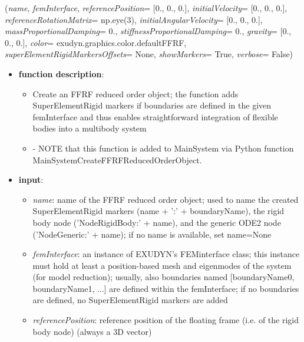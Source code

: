 %
\begin{flushleft}
\label{sec:mainsystemextensions:CreateFFRFReducedOrderObject}
({\it name}, {\it femInterface}, {\it referencePosition}= [0., 0., 0.], {\it initialVelocity}= [0., 0., 0.], {\it referenceRotationMatrix}= np.eye(3), {\it initialAngularVelocity}= [0., 0., 0.], {\it massProportionalDamping}= 0., {\it stiffnessProportionalDamping}= 0., {\it gravity}= [0., 0., 0.], {\it color}= exudyn.graphics.color.defaultFFRF, {\it superElementRigidMarkersOffsets}= None, {\it showMarkers}= True, {\it verbose}= False)
\end{flushleft}
\setlength{\itemindent}{0.7cm}
\begin{itemize}[leftmargin=0.7cm]
\item[--]
{\bf function description}: \vspace{-6pt}
\begin{itemize}[leftmargin=1.2cm]
\setlength{\itemindent}{-0.7cm}
\item[]Create an FFRF reduced order object; the function adds SuperElementRigid markers if boundaries are defined in the given femInterface and thus enables straightforward integration of flexible bodies into a multibody system
\item[]- NOTE that this function is added to MainSystem via Python function MainSystemCreateFFRFReducedOrderObject.
\end{itemize}
\item[--]
{\bf input}: \vspace{-6pt}
\begin{itemize}[leftmargin=1.2cm]
\setlength{\itemindent}{-0.7cm}
\item[]{\it name}: name of the FFRF reduced order object; used to name the created SuperElementRigid markers (name + ':' + boundaryName), the rigid body node ('NodeRigidBody:' + name), and the generic ODE2 node ('NodeGeneric:' + name); if no name is available, set name=None
\item[]{\it femInterface}: an instance of EXUDYN's FEMinterface class; this instance must hold at least a position-based mesh and eigenmodes of the system (for model reduction); usually, also boundaries named [boundaryName0, boundaryName1, ...] are defined within the femInterface; if no boundaries are defined, no SuperElementRigid markers are added
\item[]{\it referencePosition}: reference position of the floating frame (i.e. of the rigid body node) (always a 3D vector)

\end{itemize}
\end{itemize}
